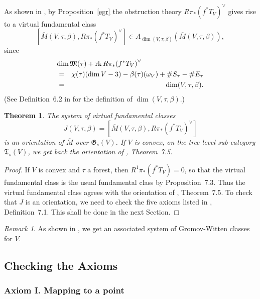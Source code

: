 \documentclass[11pt]{article}
\newcommand{\GG}{\mathfrak{G}}
\newcommand{\MM}{\mathfrak{M}}
\newcommand{\TT}{\mathfrak{T}}
\newcommand{\dual}[1]{{{#1}^{\vee}}}
\newcommand{\lst}{_{\ast}}
\newcommand{\ol}{\overline}
\DeclareMathOperator{\rk}{rk}
\renewcommand{\t}{_{\tau}}
\newcommand{\upst}{^{\ast}}
\theoremstyle{plain}
\newtheorem{them}[prop]{Theorem}
\theoremstyle{remark}
\newtheorem*{rmk}{Remark}
\newenvironment{pf}{\begin{proof}}{\end{proof}}
\theoremstyle{plain}
\theoremstyle{definition}
\theoremstyle{remark}
\begin{document}
As shown in \cite{BF}, by Proposition~\ref{egr} the obstruction theory
\(\dual{R\pi\lst(f\upst T_V)}\) gives rise to a virtual fundamental
class
\[
[\ol{M}(V,\tau,\beta),\dual{R\pi\lst(f\upst T_V)}]\in
A_{\dim(V,\tau,\beta)}(\ol{M}(V,\tau,\beta)),
\]
since
\begin{eqnarray*}
\lefteqn{\dim\MM(\tau) + \rk \dual{R\pi\lst(f\upst T_V)} }\\ & = &
\chi(\tau)(\dim V-3)-\beta(\tau)(\omega_V)+\#S\t-\#E\t \\
 & = &  \dim(V,\tau,\beta).
\end{eqnarray*}
(See Definition~6.2 in \cite{BM} for the definition of
\(\dim(V,\tau,\beta)\).)

\begin{them} \label{ot} The system of virtual fundamental classes
\[
J(V,\tau,\beta)=[\ol{M}(V,\tau,\beta),\dual{R\pi\lst(f\upst T_V)}]
\]
is an
orientation of \(\ol{M}\) over \(\GG_s(V)\). If \(V\) is convex, on the tree level
sub-category
\(\TT_s(V)\), we get back the orientation of \cite{BM}, Theorem~7.5.
\end{them}
\begin{pf} If \(V\) is convex and \(\tau\) a forest, then \(R^1\pi\lst(f\upst
T_V)=0\), so that the virtual fundamental class is the usual
fundamental class by \cite{BF} Proposition~7.3. Thus the virtual
fundamental class agrees with the orientation of \cite{BM},
Theorem~7.5. To check that \(J\) is an orientation, we need to check the
five axioms listed in
\cite{BM}, Definition~7.1. This shall be done in the next Section.
\end{pf}

\begin{rmk} As shown in \cite{BM}, we get an associated system of
Gromov-Witten
classes for \(V\).
\end{rmk}

\subsection{Checking the Axioms} \label{check}

\subsubsection{{\sc Axiom I.} Mapping to a point}
\end{document}
